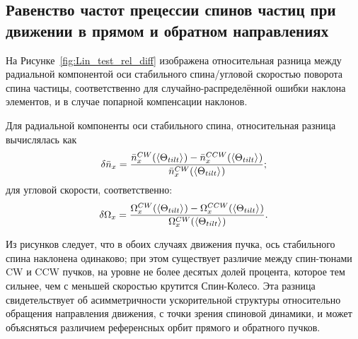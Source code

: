\subsection{Равенство частот прецессии спинов частиц при движении в прямом и обратном направлениях}\label{chpt3:imperfections:CW_vs_CCW}
На Рисунке~\ref{fig:Lin_test_rel_diff} изображена относительная разница между радиальной компонентой оси стабильного спина/угловой скоростью поворота спина частицы, соответственно для случайно-распределённой ошибки наклона элементов, и в случае попарной компенсации наклонов.

Для радиальной компоненты оси стабильного спина, относительная разница вычислялась как 
\[
\delta\bar n_x = \frac{\bar n_x^{CW}(\avg{\Theta_{tilt}}) - \bar n_x^{CCW}(\avg{\Theta_{tilt}})}{\bar n_x^{CW}(\avg{\Theta_{tilt}})};
\]
для угловой скорости, соответственно:
\[
\delta\W_x = \frac{\W_x^{CW}(\avg{\Theta_{tilt}}) - \W_x^{CCW}(\avg{\Theta_{tilt}})}{\W_x^{CW}(\avg{\Theta_{tilt}})}.
\]

Из рисунков следует, что в обоих случаях движения пучка, ось стабильного спина наклонена одинаково; при этом существует различие между спин-тюнами CW и CCW пучков, на уровне не более десятых долей процента, которое тем сильнее, чем с меньшей скоростью крутится Спин-Колесо. Эта разница  свидетельствует об асимметричности ускорительной структуры относительно обращения направления движения, с точки зрения спиновой динамики, 
и может объясняться различием референсных орбит прямого и обратного пучков. 

